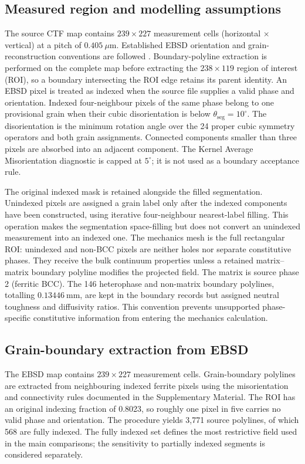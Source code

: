\documentclass[preprint,12pt]{elsarticle}
\begin{document}
\subsection{Measured region and modelling assumptions}
The source CTF map contains $239\times227$ measurement cells (horizontal $\times$ vertical) at a pitch of
$0.405~\mu\mathrm{m}$. Established EBSD orientation and grain-reconstruction conventions are followed \cite{kacher2009,wilkinson2012,britton2016,bachmann2011}. Boundary-polyline extraction is performed on the complete map
before extracting the $238\times119$ region of interest (ROI), so a boundary
intersecting the ROI edge retains its parent identity. An EBSD pixel is treated as
indexed when the source file supplies a valid phase and orientation. Indexed
four-neighbour pixels of the same phase belong to one provisional grain when
their cubic disorientation is below
\(
\theta_{\mathrm{seg}}=10^{\circ}.
\)
The disorientation is the minimum rotation angle over the 24 proper cubic
symmetry operators and both grain assignments. Connected components smaller than
three pixels are absorbed into an adjacent component. The Kernel Average
Misorientation diagnostic is capped at $5^{\circ}$; it is not used as a boundary
acceptance rule.

The original indexed mask is retained alongside the filled segmentation. Unindexed pixels are assigned a grain
label only after the indexed components have been constructed, using iterative
four-neighbour nearest-label filling. This operation makes the segmentation
space-filling but does not convert an unindexed measurement into an indexed one.
The mechanics mesh is the full rectangular ROI: unindexed and non-BCC pixels are
neither holes nor separate constitutive phases. They receive the bulk continuum
properties unless a retained matrix--matrix boundary polyline modifies the projected field.
The matrix is source phase 2 (ferritic BCC). The 146 heterophase and non-matrix
boundary polylines, totalling \(0.13446~\mathrm{mm}\), are
kept in the boundary records but assigned neutral toughness and diffusivity ratios.
This convention prevents unsupported phase-specific constitutive information from
entering the mechanics calculation.
\subsection{Grain-boundary extraction from EBSD}

The EBSD map contains \(239\times227\) measurement cells. Grain-boundary
polylines are extracted from neighbouring indexed ferrite pixels using the
misorientation and connectivity rules documented in the Supplementary Material.
The ROI has an original indexing fraction of 0.8023, so roughly one pixel in five
carries no valid phase and orientation. The procedure yields 3,771 source
polylines, of which 568 are fully indexed. The
fully indexed set defines the most restrictive field used in the main comparisons;
the sensitivity to partially indexed segments is considered separately.
\end{document}
